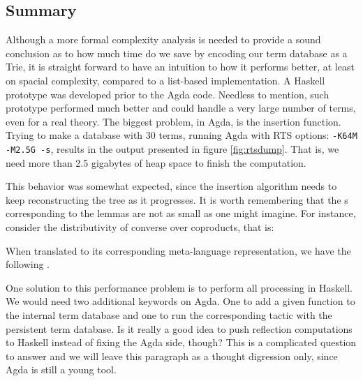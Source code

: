 \subsection{Summary}

Although a more formal complexity analysis is needed to provide a sound conclusion as to
how much time do we save by encoding our term database as a Trie, it is straight forward to have
an intuition to how it performs better, at least on spacial complexity, compared to a list-based
implementation. A Haskell prototype was developed prior to the Agda code. Needless to mention,
such prototype performed much better and could handle a very large number of terms, even for a real theory.
The biggest problem, in Agda, is the insertion function. Trying to make a database with 30 terms,
running Agda with RTS options: \texttt{\small -K64M -M2.5G -s}, results in the output presented
in figure \ref{fig:rtsdump}. That is, we need more than 2.5 gigabytes of heap space to finish
the computation.

This behavior was somewhat expected, since the insertion algorithm needs to keep
reconstructing the tree as it progresses. It is worth remembering that the s
corresponding to the lemmas are not as small as one might imagine. For instance,
consider the distributivity of converse over coproducts, that is:


When translated to its corresponding meta-language representation, we have the following .


One solution to this performance problem is to perform all processing in Haskell. We would need
two additional keywords on Agda. One to add a given function to the internal term database
and one to run the corresponding  tactic with the persistent term database. Is it really
a good idea to push reflection computations to Haskell instead of fixing the Agda side, though?
This is a complicated question to answer and we will leave this paragraph as a thought
digression only, since Agda is still a young tool.


